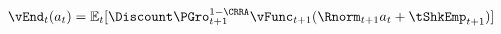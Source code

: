   \begin{equation}\begin{gathered}\begin{aligned}
    {\vEnd}_{t}({a}_{t})  & = \Ex_{t}[\Discount \PGro_{t+1}^{1-\CRRA}\null{\vFunc}_{t+1}(\Rnorm_{t+1} {a}_{t}+{\tShkEmp}_{t+1})]  \label{eq:vEndtdefn}
  \end{aligned}\end{gathered}\end{equation}
